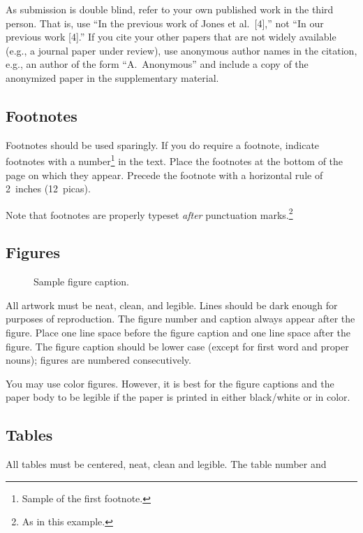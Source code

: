 \documentclass{article}
\begin{document}
As submission is double blind, refer to your own published work in the third
person. That is, use ``In the previous work of Jones et al.\ [4],'' not ``In our
previous work [4].'' If you cite your other papers that are not widely available
(e.g., a journal paper under review), use anonymous author names in the
citation, e.g., an author of the form ``A.\ Anonymous'' and include a copy of the anonymized paper in the supplementary material.


\subsection{Footnotes}


Footnotes should be used sparingly.  If you do require a footnote, indicate
footnotes with a number\footnote{Sample of the first footnote.} in the
text. Place the footnotes at the bottom of the page on which they appear.
Precede the footnote with a horizontal rule of 2~inches (12~picas).


Note that footnotes are properly typeset \emph{after} punctuation
marks.\footnote{As in this example.}


\subsection{Figures}


\begin{figure}
  \centering
  \fbox{\rule[-.5cm]{0cm}{4cm} \rule[-.5cm]{4cm}{0cm}}
  \caption{Sample figure caption.}
\end{figure}


All artwork must be neat, clean, and legible. Lines should be dark enough for
purposes of reproduction. The figure number and caption always appear after the
figure. Place one line space before the figure caption and one line space after
the figure. The figure caption should be lower case (except for first word and
proper nouns); figures are numbered consecutively.


You may use color figures.  However, it is best for the figure captions and the
paper body to be legible if the paper is printed in either black/white or in
color.


\subsection{Tables}


All tables must be centered, neat, clean and legible.  The table number and
\end{document}
